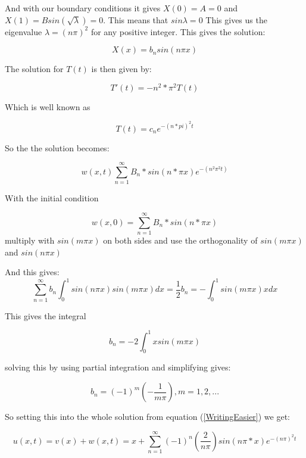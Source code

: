 \documentclass[a4paper,10pt]{article}
\begin{document}
And with our boundary conditions it gives $X(0) = A = 0$ and $X(1) = Bsin(\sqrt{\lambda}) = 0$.
This means that $sin\lambda = 0$ This gives us the eigenvalue $\lambda = (n\pi)^2$ for any positive integer.
This gives the solution:

\begin{equation}
 X(x) = b_nsin(n\pi x)
\end{equation}

The solution for $T(t)$ is then given by:

\begin{equation}
 T'(t) = -n^2*\pi ^2 T(t)
\end{equation}

Which is well known as 

\begin{equation}
 T(t) = c_ne^{-(n*pi)^2t}
\end{equation}

So the the solution becomes:

\begin{equation}
 w(x,t) \sum_{n=1}^{\infty} B_n*sin(n*\pi x)e^{-(n^2\pi^2t)}
 \end{equation}
 
With the initial condition

\begin{equation}
 w(x,0) = \sum_{n=1}^{\infty} B_n*sin(n*\pi x)
\end{equation}
multiply with $sin(m\pi x)$ on both sides and use the orthogonality of $sin(m\pi x)$  and $sin(n\pi x)$

And this gives:
\begin{equation}
 \sum_{n=1}^{\infty} b_n \int_0^1 sin(n\pi x)sin(m\pi x)dx = \frac{1}{2}b_n = -\int_0^1 sin(m\pi x)x dx
\end{equation}

This gives the integral

\begin{equation}
 b_n = -2\int_0^1 xsin(m\pi x)
\end{equation}

solving this by using partial integration and simplifying gives:

\begin{equation}
 b_n = (-1)^m(-\frac{1}{m\pi})		, m=1,2,...
\end{equation}

So setting this into the whole solution from equation (\ref{WritingEasier}) we get:

\begin{equation}
 u(x,t) = v(x) + w(x,t) = 
 x + \sum_{n=1}^{\infty}(-1)^n(\frac{2}{n\pi})sin(n\pi*x)e^{-(n\pi)^2t}
\end{equation}
\end{document}
